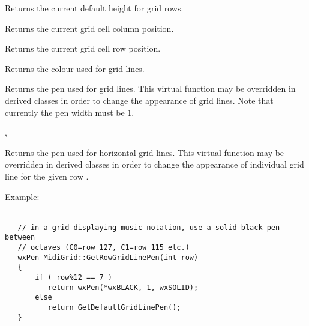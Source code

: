 
Returns the current default height for grid rows.



\label{wxgridgetgridcursorcol}


Returns the current grid cell column position.



\label{wxgridgetgridcursorrow}


Returns the current grid cell row position.



\label{wxgridgetgridlinecolour}


Returns the colour used for grid lines.




\label{wxgridgetdefaultgridlinepen}


Returns the pen used for grid lines. This virtual function may be overridden in
derived classes in order to change the appearance of grid lines. Note that
currently the pen width must be $1$.


,\\




\label{wxgridgetrowgridlinepen}


Returns the pen used for horizontal grid lines. This virtual function may be
overridden in derived classes in order to change the appearance of individual
grid line for the given row .

Example: \\
\\
\begin{verbatim}
   // in a grid displaying music notation, use a solid black pen between
   // octaves (C0=row 127, C1=row 115 etc.)
   wxPen MidiGrid::GetRowGridLinePen(int row)
   {
       if ( row%12 == 7 )
          return wxPen(*wxBLACK, 1, wxSOLID);
       else 
          return GetDefaultGridLinePen();
   }
\end{verbatim}



